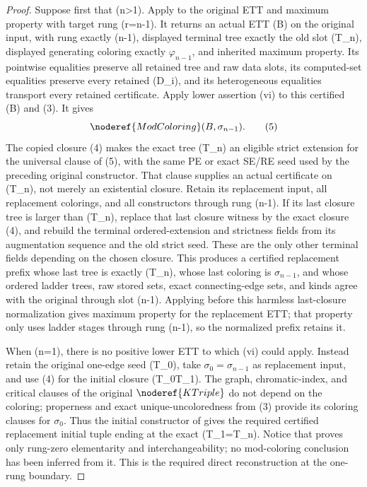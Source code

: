 \begin{proof}
Suppose first that (n>1).  Apply
 to the original ETT and maximum
property with target rung (r=n-1).  It returns an actual ETT (B) on the
original input, with rung exactly (n-1), displayed terminal tree exactly
the old slot (T_n), displayed generating coloring exactly
\(\varphi_{n-1}\), and inherited maximum property.  Its pointwise
equalities preserve all retained tree and raw data slots, its computed-set
equalities preserve every retained (D_i), and its heterogeneous
equalities transport every retained 
certificate.  Apply lower assertion (vi) to this certified (B) and (3).
It gives
\[
                         \noderef{ModColoring}(B,\sigma_{n-1}). \tag{5}
\]
The copied closure (4) makes the exact tree (T_n) an eligible strict
extension for the universal clause of (5), with the same PE or exact
SE/RE seed used by the preceding original constructor.  That clause
supplies an actual 
certificate on (T_n), not merely an existential closure.  Retain its
replacement input, all replacement colorings, and all constructors
through rung (n-1).  If its last closure tree is larger than (T_n),
replace that last closure witness by the exact closure (4), and rebuild
the terminal ordered-extension and strictness fields from its augmentation
sequence and the old strict seed.  These are the only other terminal
fields depending on the chosen closure.  This produces a certified
replacement prefix whose last tree is
exactly (T_n), whose last coloring is \(\sigma_{n-1}\), and whose
ordered ladder trees, raw stored sets, exact connecting-edge sets, and
kinds agree with the original through slot (n-1).  Applying
 before this harmless last-closure
normalization gives maximum property for the replacement ETT; that
property only uses ladder stages through rung (n-1), so the normalized
prefix retains it.

When (n=1), there is no positive lower ETT to which (vi) could apply.
Instead retain the original one-edge seed (T_0), take
\(\sigma_0=\sigma_{n-1}\) as replacement input, and use (4) for the
initial closure (T_0\to T_1).  The graph, chromatic-index, and critical
clauses of the original \(\noderef{KTriple}\) do not depend on the
coloring; properness and exact unique-uncoloredness from (3) provide its
coloring clauses for \(\sigma_0\).  Thus the initial constructor of
 gives the required certified replacement
initial tuple ending at the exact (T_1=T_n).  Notice that
 proves only rung-zero elementarity and
interchangeability; no mod-coloring conclusion has been inferred from it.
This is the required direct reconstruction at the one-rung boundary.


\end{proof}
